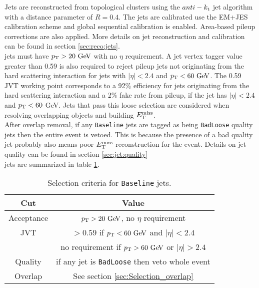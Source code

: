 \indent Jets are reconstructed from topological clusters using the $anti-k_{\rm{t}}$ jet algorithm~\cite{antikt} with a distance parameter of $R = 0.4$.  The jets are calibrated use the EM+JES calibration scheme and global sequential calibration is enabled. Area-based pileup corrections are also applied. More details on jet reconstruction and calibration can be found in section \ref{sec:reco:jets}. \\
  
 jets must have $\pT > 20\gev$ with no $\eta$ requirement. A jet vertex tagger value greater than 0.59 is also required to reject pileup jets not originating from the hard scattering interaction for jets with $|\eta|<2.4$ and $\pt < 60 \gev$.  The 0.59 JVT working point corresponds to a 92\% efficiency for jets originating from the hard scattering interaction and a 2\% fake rate from pileup, if the jet has $|\eta|<2.4$ and $p_{\mathrm{T}}<60$ GeV. Jets that pass this loose selection are considered when resolving overlapping objects and building $E_{\mathrm{T}}^{\mathrm{miss}}$.  \\

\indent After overlap removal, if any {\tt Baseline} jets are tagged as being {\tt BadLoose} quality jets then the entire event is vetoed.  This is because the presence of a bad quality jet probably also means poor $E_{\mathrm{T}}^{\mathrm{miss}}$ reconstruction for the event.  Details on jet quality can be found in section \ref{sec:jet:quality} \\

 jets are summarized in table \ref{tb:jets:baseline}. \\

\begin{table}[htp]
  \begin{center}
    \begin{tabular}{c|c} \hline \hline
      Cut & Value \\ \hline \hline
      Acceptance & $\pT > 20\gev$, no $\eta$ requirement \\ \hline
      JVT & $> 0.59$ if $\pt < 60 \gev$ and $|\eta| < 2.4$ \\
             & no requirement if $\pt > 60 \gev$ or $|\eta| > 2.4$ \\ \hline
      Quality & if any jet is {\tt BadLoose} then veto whole event  \\ \hline
      Overlap & See section \ref{sec:Selection_overlap} \\ \hline
      \hline
    \end{tabular}
  \caption{Selection criteria for {\tt Baseline} jets.} 
  \end{center}
  \label{tb:jets:baseline}
\end{table}%

